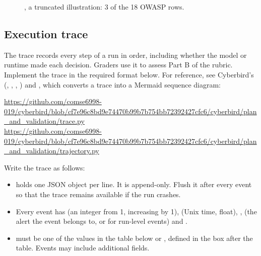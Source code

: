 \documentclass[9pt,letterpaper]{article}
\begin{document}
\begin{figure}[t]
\inputminted[fontsize=\scriptsize]{json}{../examples/report.example.json}
\caption{, a truncated illustration: 3 of the 18 OWASP rows.}\label{fig:report}
\end{figure}

\subsection{Execution trace}\label{sec:trace}

The trace records every step of a run in order, including whether the model or
runtime made each decision. Graders use it to assess Part B of the rubric.
Implement the trace in the required format below. For reference, see Cyberbird's
 (,
, , ) and
, which converts a trace into a
Mermaid sequence diagram:
\par\noindent\begin{minipage}{\linewidth}\raggedright
\url{https://github.com/comse6998-019/cyberbird/blob/cf7e96c8bd9e74470b99b7b754bb72392427cfc6/cyberbird/plan_and_validation/trace.py}\\
\url{https://github.com/comse6998-019/cyberbird/blob/cf7e96c8bd9e74470b99b7b754bb72392427cfc6/cyberbird/plan_and_validation/trajectory.py}
\end{minipage}\par

Write the trace as follows:
\begin{itemize}
\item {} holds one JSON object per line. It is
  append-only. Flush it after every event so that the trace remains available
  if the run crashes.
\item Every event has  (an integer from 1, increasing by 1),
   (Unix time, float), ,  (the alert the
  event belongs to, or  for run-level events) and .
\item {} must be one of the values in the table below or
  , defined in the box after the table. Events may include
  additional fields.
\end{itemize}
\end{document}
